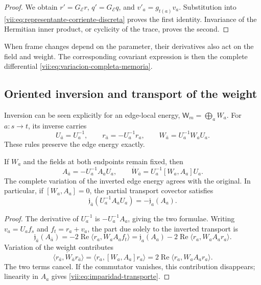 \begin{proof}
We obtain \(r'=G_{\mathcal E}r\), \(q'=G_{\mathcal E}q\), and
\(v'_a=g_{t(a)}v_a\). Substitution into
\eqref{vii:eq:representante-corriente-discreta} proves the first
identity. Invariance of the Hermitian inner product, or cyclicity of
the trace, proves the second.
\end{proof}

When frame changes depend on the parameter, their derivatives
also act on the field and weight. The corresponding covariant
expression is then the complete differential
\eqref{vii:eq:variacion-completa-memoria}.

\subsection{Oriented inversion and transport of the weight}
\label{vii:subsec:inversion-respuesta}

Inversion can be seen explicitly for an edge-local
energy, \(\mathsf W_m=\bigoplus_a W_a\).
For \(a:s\to t\), its inverse carries
\[
 U_{\bar a}=U_a^{-1},\qquad
 r_{\bar a}=-U_a^{-1}r_a,\qquad
 W_{\bar a}=U_a^{-1}W_aU_a.
\]
These rules preserve the edge energy exactly.

\begin{proposition}
\label{vii:prop:inversion-respuesta}
If \(W_a\) and the fields at both endpoints remain fixed, then
\[
 A_{\bar a}=-U_a^{-1}A_aU_a,\qquad
 \dot W_{\bar a}=U_a^{-1}[W_a,A_a]U_a.
\]
The complete variation of the inverted edge energy agrees with
the original. In particular, if \([W_a,A_a]=0\), the partial transport
covector satisfies
\begin{equation}
 \mathfrak j_{\bar a}(U_a^{-1}A_aU_a)
 =-\mathfrak j_a(A_a).
 \label{vii:eq:imparidad-transporte}
\end{equation}
\end{proposition}

\begin{proof}
The derivative of \(U_a^{-1}\) is \(-U_a^{-1}A_a\), giving
the two formulae. Writing \(v_a=U_af_s\) and \(f_t=r_a+v_a\),
the part due solely to the inverted transport is
\[
 \mathfrak j_{\bar a}(A_{\bar a})
 =-2\operatorname{Re}\langle r_a,W_aA_af_t\rangle
 =\mathfrak j_a(A_a)
   -2\operatorname{Re}\langle r_a,W_aA_ar_a\rangle.
\]
Variation of the weight contributes
\[
 \langle r_{\bar a},\dot W_{\bar a}r_{\bar a}\rangle
 =\langle r_a,[W_a,A_a]r_a\rangle
 =2\operatorname{Re}\langle r_a,W_aA_ar_a\rangle.
\]
The two terms cancel. If the commutator vanishes, this contribution
disappears; linearity in \(A_a\) gives
\eqref{vii:eq:imparidad-transporte}.
\end{proof}

